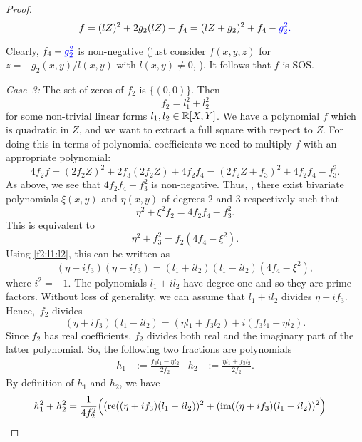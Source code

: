 \begin{proof}
	\[
		f = (l Z)^2 + 2 g_2 (l Z) + f_4 = (l Z + g_2)^2 + f_4 - \textcolor{blue}{g_2^2. }
	\]
	
	Clearly,  $f_4 - \textcolor{blue}{g_2^2}$  is non-negative (just consider $f(x,y,z)$ for $z= - g_2(x,y) / l(x,y)$ with $l(x,y) \ne 0$, ).
	It follows that $f$ is SOS. 
	
\smallskip
	\emph{Case~3:} The set of zeros of $f_2$ is $\{(0,0)\}$. Then 
	\begin{equation}
		\label{f2:l1:l2}
		f_2 = l_1^2 + l_2^2
	\end{equation} 
	for some non-trivial linear forms $l_1, l_2 \in \mathbb{R}[X,Y]$. We have a polynomial $f$ which is quadratic in $Z$, and we want to extract a full square with respect to $Z$. For doing this in terms of polynomial coefficients we need to multiply $f$ with an appropriate polynomial: 
	\[
		4 f_2 f = (2 f_2 Z)^2 + 2 f_3 ( 2 f_2 Z) + 4 f_2 f_4 = (2 f_2 Z + f_3)^2 + 4 f_2 f_4 - f_3^2.
	\]
	As above, we see that $4 f_2 f_4 - f_3^2$ is non-negative. Thus, , there exist bivariate polynomials $\xi(x,y)$ and $\eta(x,y)$ of degrees $2$ and $3$ respectively such that 
	\[
		\eta^2 + \xi^2 f_2 = 4 f_2 f_4 - f_3^2.
	\] 
	This is equivalent to
	\begin{equation}
		\label{eta:f3}
		\eta^2 +f_3^2 = f_2 (4 f_4 - \xi^2). 
	\end{equation}
	Using \eqref{f2:l1:l2}, this can be written as 
	\[
	(\eta + i f_3)(\eta - i f_3) = (l_1 + i l_2) (l_1 - i l_2)( 4 f_4 - \xi^2),
	\]
	where $i^2 = -1$. The polynomials $l_1 \pm i l_2$ have degree one and so they are prime factors. Without loss of generality, we can assume that $l_1 + i l_2$ divides $\eta + i f_3$. Hence,~$f_2$ divides 
	\[
		(\eta+ i f_3) (l_1 - i l_2) = (\eta l_1 + f_3 l_2) + i ( f_3 l_1 - \eta l_2).
	\]
	Since $f_2$ has real coefficients, $f_2$ divides both real and the imaginary part of the latter polynomial. So, the following two fractions are polynomials
	\begin{align*}
		h_1 & := \frac{f_3 l_1 - \eta l_2}{2 f_2} &  h_2 &:= \frac{\eta l_1 + f_3 l_2}{2 f_2}.
	\end{align*}
	By definition of $h_1$ and $h_2$, we have 
	\begin{align*}
		h_1^2 + h_2^2 & = \frac{1}{4 f_2^2} \Bigl((\re ((\eta+i f_3)(l_1-il_2))^2 +  (\im ((\eta+ i f_3)(l_1 - i l_2))^2 \Bigr) 

\end{align*}
\end{proof}
